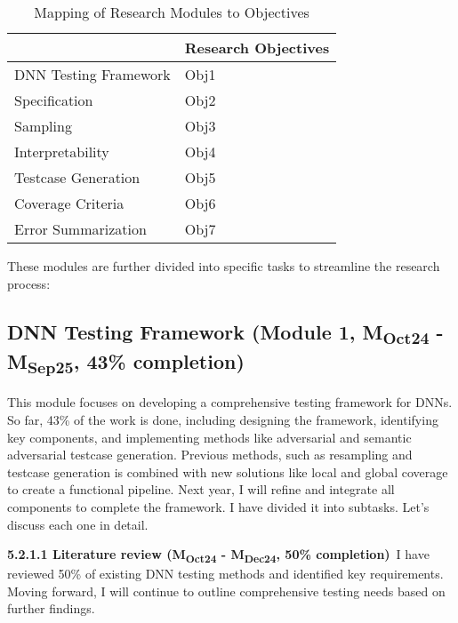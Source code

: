 \begin{table}[ht]
  \centering
  \renewcommand{\arraystretch}{1.5} %
  \begin{tabular}{|l|l|}
    \hline
    \rowcolor[HTML]{000000} 
    \multicolumn{1}{|c|}{\cellcolor[HTML]{000000}{\color[HTML]{FFFFFF} \textbf{Research Modules}}} & {\color[HTML]{FFFFFF} \textbf{Research Objectives}} \\ \hline
    {\color[HTML]{404040} DNN Testing Framework} & Obj1 \\ \hline
    {\color[HTML]{404040} Specification} & Obj2 \\ \hline
    {\color[HTML]{404040} Sampling} & Obj3 \\ \hline
    {\color[HTML]{404040} Interpretability} & Obj4 \\ \hline
    {\color[HTML]{404040} Testcase Generation} & Obj5 \\ \hline
    {\color[HTML]{404040} Coverage Criteria} & Obj6 \\ \hline
    Error Summarization & Obj7 \\ \hline
  \end{tabular}
  \caption{Mapping of Research Modules to Objectives}
  \label{table:modules}
\end{table}

These modules are further divided into specific tasks to streamline the research process:

\subsection{DNN Testing Framework (Module 1, M\textsubscript{Oct24} - M\textsubscript{Sep25}, 43\% completion)} \noindent This module focuses on developing a comprehensive testing framework for DNNs. So far, 43\% of the work is done, including designing the framework, identifying key components, and implementing methods like adversarial and semantic adversarial testcase generation. Previous methods, such as resampling and testcase generation is combined with new solutions like local and global coverage to create a functional pipeline. Next year, I will refine and integrate all components to complete the framework. I have divided it into subtasks. Let's discuss each one in detail.

\noindent \textbf{5.2.1.1 Literature review (M\textsubscript{Oct24} - M\textsubscript{Dec24}, 50\% completion)}\ I have reviewed 50\% of existing DNN testing methods and identified key requirements. Moving forward, I will continue to outline comprehensive testing needs based on further findings.

